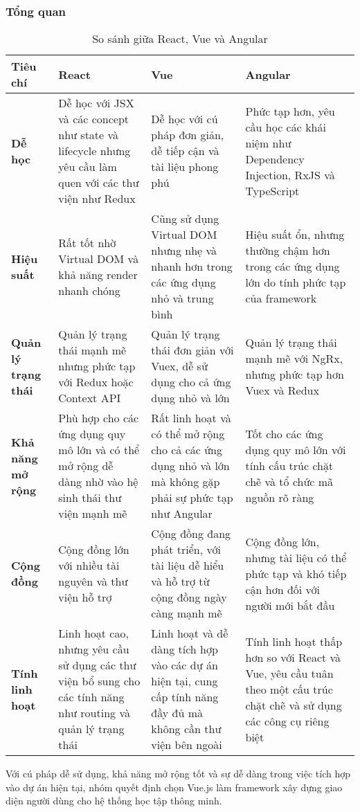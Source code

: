 \subsubsection{Tổng quan}
\begin{table}[H]
    \centering
    \begin{tabular}{|p{2.5cm}|p{4.5cm}|p{4.5cm}|p{4.5cm}|}
    \hline
    \textbf{Tiêu chí} & \textbf{React} & \textbf{Vue} & \textbf{Angular} \\
    \hline
    \textbf{Dễ học} & Dễ học với JSX và các concept như state và lifecycle nhưng yêu cầu làm quen với các thư viện như Redux & Dễ học với cú pháp đơn giản, dễ tiếp cận và tài liệu phong phú & Phức tạp hơn, yêu cầu học các khái niệm như Dependency Injection, RxJS và TypeScript \\
    \hline
    \textbf{Hiệu suất} & Rất tốt nhờ Virtual DOM và khả năng render nhanh chóng & Cũng sử dụng Virtual DOM nhưng nhẹ và nhanh hơn trong các ứng dụng nhỏ và trung bình & Hiệu suất ổn, nhưng thường chậm hơn trong các ứng dụng lớn do tính phức tạp của framework \\
    \hline
    \textbf{Quản lý trạng thái} & Quản lý trạng thái mạnh mẽ nhưng phức tạp với Redux hoặc Context API & Quản lý trạng thái đơn giản với Vuex, dễ sử dụng cho cả ứng dụng nhỏ và lớn & Quản lý trạng thái mạnh mẽ với NgRx, nhưng phức tạp hơn Vuex và Redux \\
    \hline
    \textbf{Khả năng mở rộng} & Phù hợp cho các ứng dụng quy mô lớn và có thể mở rộng dễ dàng nhờ vào hệ sinh thái thư viện mạnh mẽ & Rất linh hoạt và có thể mở rộng cho cả các ứng dụng nhỏ và lớn mà không gặp phải sự phức tạp như Angular & Tốt cho các ứng dụng quy mô lớn với tính cấu trúc chặt chẽ và tổ chức mã nguồn rõ ràng \\
    \hline
    \textbf{Cộng đồng} & Cộng đồng lớn với nhiều tài nguyên và thư viện hỗ trợ & Cộng đồng đang phát triển, với tài liệu dễ hiểu và hỗ trợ từ cộng đồng ngày càng mạnh mẽ & Cộng đồng lớn, nhưng tài liệu có thể phức tạp và khó tiếp cận hơn đối với người mới bắt đầu \\
    \hline
    \textbf{Tính linh hoạt} & Linh hoạt cao, nhưng yêu cầu sử dụng các thư viện bổ sung cho các tính năng như routing và quản lý trạng thái & Linh hoạt và dễ dàng tích hợp vào các dự án hiện tại, cung cấp tính năng đầy đủ mà không cần thư viện bên ngoài & Tính linh hoạt thấp hơn so với React và Vue, yêu cầu tuân theo một cấu trúc chặt chẽ và sử dụng các công cụ riêng biệt \\
    \hline
    \end{tabular}
    \caption{So sánh giữa React, Vue và Angular}
\end{table}
Với cú pháp dễ sử dụng, khả năng mở rộng tốt và sự dễ dàng trong việc tích hợp vào dự án hiện tại, nhóm quyết định chọn Vue.js làm framework xây dựng giao diện người dùng cho hệ thống học tập thông minh.
